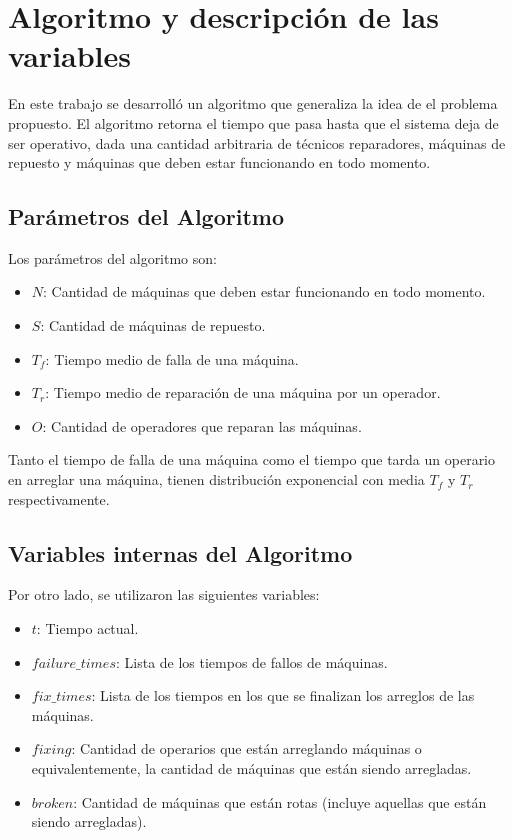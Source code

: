 \section{Algoritmo y descripción de las variables}

    \par En este trabajo se desarrolló un algoritmo que
    generaliza la idea de el problema propuesto. El algoritmo retorna el tiempo
    que pasa hasta que el sistema deja de ser operativo, dada una cantidad
    arbitraria de técnicos reparadores, máquinas de repuesto y máquinas que deben
    estar funcionando en todo momento.

    \subsection{Parámetros del Algoritmo}

        \par Los parámetros del algoritmo son:
        \begin{itemize}
            \item{$N$: Cantidad de máquinas que deben estar funcionando en todo
              momento.}
            \item{$S$: Cantidad de máquinas de repuesto.}
            \item{$T_f$: Tiempo medio de falla de una máquina.}
            \item{$T_r$: Tiempo medio de reparación de una máquina por un
              operador.}
            \item{$O$: Cantidad de operadores que reparan las máquinas.}
        \end{itemize}

        \par Tanto el tiempo de falla de una máquina como el tiempo que tarda un
        operario en arreglar una máquina, tienen distribución exponencial con
        media $T_f$ y $T_r$ respectivamente.


    \subsection{Variables internas del Algoritmo}

        Por otro lado, se utilizaron las siguientes variables:
        \begin{itemize}
            \item{$t$: Tiempo actual.}
            \item{$failure\_times$: Lista de los tiempos de fallos de máquinas.}
            \item{$fix\_times$: Lista de los tiempos en los que se finalizan los
              arreglos de las máquinas.}
            \item{$fixing$: Cantidad de operarios que están arreglando
              máquinas o equivalentemente, la cantidad de máquinas que están
              siendo arregladas.}
            \item{$broken$: Cantidad de máquinas que están rotas (incluye
              aquellas que están siendo arregladas).}
        \end{itemize}

